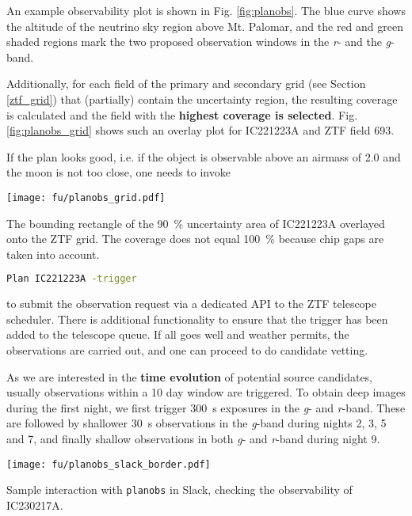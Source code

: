 An example observability plot is shown in Fig. \ref{fig:planobs}. The blue curve shows the altitude of the neutrino sky region above Mt. Palomar, and the red and green shaded regions mark the two proposed observation windows in the \textit{r}- and the \textit{g}-band.

Additionally, for each field of the primary and secondary grid (see Section \ref{ztf_grid}) that (partially) contain the uncertainty region, the resulting coverage is calculated and the field with the \textbf{highest coverage is selected}. Fig. \ref{fig:planobs_grid} shows such an overlay plot for IC221223A and ZTF field 693.

If the plan looks good, i.e. if the object is observable above an airmass of 2.0 and the moon is not too close, one needs to invoke
\begin{marginfigure}
    \texttt{[image: fu/planobs\_grid.pdf]}
    \caption[\texttt{planobs} ZTF grid]{The bounding rectangle of the \SI{90}{\percent} uncertainty area of IC221223A overlayed onto the ZTF grid. The coverage does not equal \SI{100}{\percent} because chip gaps are taken into account.}
\end{marginfigure}
\begin{lstlisting}[language=bash,style=kaolstplain]
Plan IC221223A -trigger
\end{lstlisting}

to submit the observation request via a dedicated API to the ZTF telescope scheduler. There is additional functionality to ensure that the trigger has been added to the telescope queue. If all goes well and weather permits, the observations are carried out, and one can proceed to do candidate vetting.

As we are interested in the \textbf{time evolution} of potential source candidates, usually observations within a 10 day window are triggered. To obtain deep images during the first night, we first trigger \SI{300}{\second} exposures in the \textit{g}- and \textit{r}-band. These are followed by shallower \SI{30}{\second} observations in the \textit{g}-band during nights 2, 3, 5 and 7, and finally shallow observations in both \textit{g}- and \textit{r}-band during night 9.
\begin{marginfigure}
    \texttt{[image: fu/planobs\_slack\_border.pdf]}
    \caption[\texttt{planobs} Slack interaction]{Sample interaction with \texttt{planobs} in Slack, checking the observability of IC230217A.}
\end{marginfigure} 
